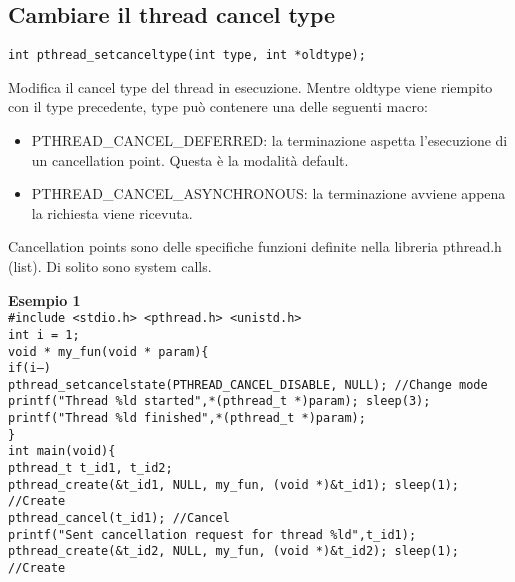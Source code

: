 \begin{flushleft}
  \subsection{Cambiare il thread cancel type }
  \begin{flushleft}
    \begin{flushleft}
      \texttt{int pthread\_setcanceltype(int type, int *oldtype); }
    \end{flushleft}
    Modifica il cancel type del thread in esecuzione. Mentre oldtype viene riempito con 
    il type precedente, type può contenere una delle seguenti macro:
    \begin{itemize}
      \item PTHREAD\_CANCEL\_DEFERRED: la terminazione aspetta l’esecuzione di un 
      cancellation point. Questa è la modalità default.
      \item PTHREAD\_CANCEL\_ASYNCHRONOUS: la terminazione avviene appena la richiesta 
      viene ricevuta.
    \end{itemize}
    Cancellation points sono delle specifiche funzioni definite nella libreria pthread.h 
    (list). Di solito sono system calls.
    \begin{flushleft}
      \textbf{Esempio 1}\\
      \texttt{\#include <stdio.h> <pthread.h> <unistd.h> \\
      int i = 1;\\
      void * my\_fun(void * param)\{ \\
      \halftab if(i--) \\
      \halftab pthread\_setcancelstate(PTHREAD\_CANCEL\_DISABLE, NULL); //Change mode\\
      \halftab printf("Thread \%ld started\n",*(pthread\_t *)param); sleep(3);\\
      \halftab printf("Thread \%ld finished\n",*(pthread\_t *)param);\\
      \}\\
      int main(void)\{\\
      \halftab pthread\_t t\_id1, t\_id2;\\
      \halftab pthread\_create(\&t\_id1, NULL, my\_fun, (void *)\&t\_id1); sleep(1); //Create\\
      \halftab pthread\_cancel(t\_id1); //Cancel\\
      \halftab printf("Sent cancellation request for thread \%ld\n",t\_id1);\\
      \halftab pthread\_create(\&t\_id2, NULL, my\_fun, (void *)\&t\_id2); sleep(1); //Create\\
}
\end{flushleft}
\end{flushleft}
\end{flushleft}
